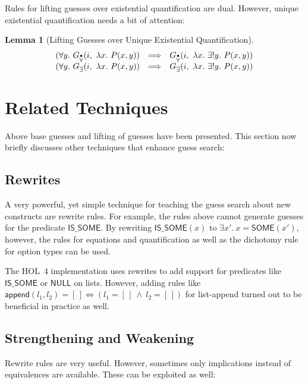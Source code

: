 \documentclass[a4paper,12pt,DIV=12,oneside]{scrbook}
\newtheorem{lemma}{Lemma}[section]
\theoremstyle{definition}
\theoremstyle{remark}
\newcommand{\GEG}{\ensuremath{G_{\accentset{\_\,\_}{\exists}}}}
\newcommand{\GUP}{\ensuremath{G_{\accentset{\bullet}{\forall}}}}
\begin{document}
Rules for lifting guesses over existential quantification are dual. However, unique existential quantification needs a bit
of attention:

\begin{lemma}[Lifting Guesses over Unique Existential Quantification]
\[
\begin{array}{c@{\quad}c@{\quad}l}
(\forall y.\ \GUP(i,\ \lambda x.\ P(x, y)) & \Longrightarrow & \GUP(i,\ \lambda x.\ \exists! y.\ P(x, y)) \\
(\forall y.\ \GEG(i,\ \lambda x.\ P(x, y)) & \Longrightarrow & \GEG(i,\ \lambda x.\ \exists! y.\ P(x, y))
\end{array}
\]
\end{lemma}


\section{Related Techniques}\label{sec_other_techniques}

Above base guesses and lifting of guesses have been presented. This section now
briefly discusses other techniques that enhance guess search:

\subsection{Rewrites}\label{subsec_other_techniques_rewrites}

A very powerful, yet simple technique for teaching the guess search
about new constructs are rewrite rules. For example, the rules above
cannot generate guesses for the predicate $\textsf{IS\_SOME}$. By
rewriting $\textsf{IS\_SOME}(x)$ to $\exists x'.\ x =
\textsf{SOME}(x')$, however, the rules for equations and
quantification as well as the dichotomy rule for option types can be
used.

The HOL~4 implementation uses rewrites to add support for predicates
like $\textsf{IS\_SOME}$ or $\textsf{NULL}$ on lists. However, adding
rules like $\textsf{append}(l_1, l_2) = [\,] \Longleftrightarrow (l_1 =
[\,]\ \wedge\ l_2 = [\,])$ for list-append turned out to be beneficial
in practice as well.

\subsection{Strengthening and Weakening}\label{subsec_other_techniques_imp}

Rewrite rules are very useful. However, sometimes only implications instead of
equivalences are available. These can be exploited as well:
\end{document}
